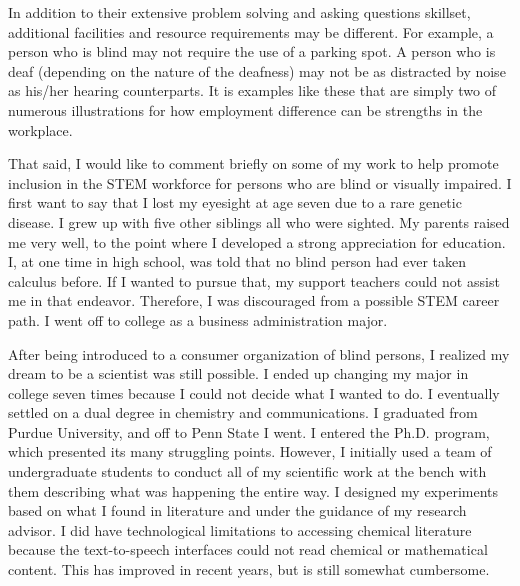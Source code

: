 \documentclass[11.5pt]{sig-alternate} %
\begin{document}
\begin{large}
In addition to their extensive problem solving and asking questions skillset, additional facilities and resource requirements may be different. For example, a person who is blind may not require the use of a parking spot. A person who is deaf (depending on the nature of the deafness) may not be as distracted by noise as his/her hearing counterparts. It is examples like these that are simply two of numerous illustrations for how employment difference can be strengths in the workplace. 

That said, I would like to comment briefly on some of my work to help promote inclusion in the STEM workforce for persons who are blind or visually impaired. I first want to say that I lost my eyesight at age seven due to a rare genetic disease. I grew up with five other siblings all who were sighted. My parents raised me very well, to the point where I developed a strong appreciation for education. I, at one time in high school, was told that no blind person had ever taken calculus before. If I wanted to pursue that, my support teachers could not assist me in that endeavor. Therefore, I was discouraged from a possible STEM career path. I went off to college as a business administration major. 

After being introduced to a consumer organization of blind persons, I realized my dream to be a scientist was still possible. I ended up changing my major in college seven times because I could not decide what I wanted to do. I eventually settled on a dual degree in chemistry and communications. I graduated from Purdue University, and off to Penn State I went. I entered the Ph.D. program, which presented its many struggling points. However, I initially used a team of undergraduate students to conduct all of my scientific work at the bench with them describing what was happening the entire way. I designed my experiments based on what I found in literature and under the guidance of my research advisor. I did have technological limitations to accessing chemical literature because the text-to-speech interfaces could not read chemical or mathematical content. This has improved in recent years, but is still somewhat cumbersome.


\end{large}
\end{document}
